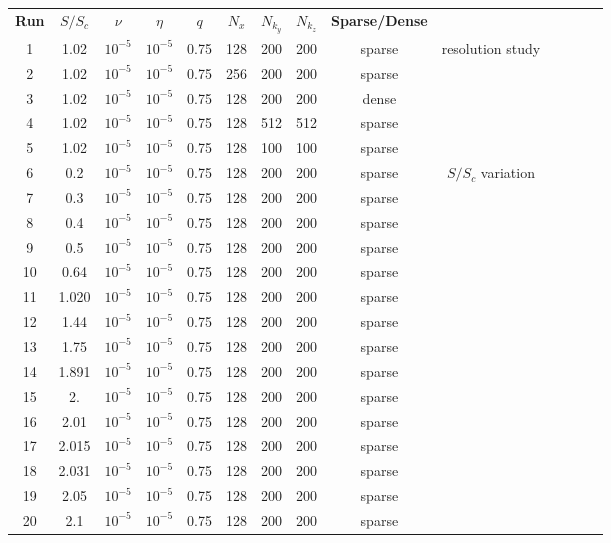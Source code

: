 \documentclass[aps,prl,preprint
,superscriptaddress]{revtex4-1}
\newcommand{\SSC}{S/S_{c}}
\begin{document}
\begin{tabular}{cccccccccccccc}
\textbf{Run} & \textbf{$\SSC$} & \textbf{$\nu$} & \textbf{$\eta$} & \textbf{$q$} & \textbf{$N_x$} & \textbf{$N_{k_y}$} & \textbf{$N_{k_z}$} & \textbf{Sparse/Dense}& \\
1  &   1.02 & $10^{-5}$ & $10^{-5}$ & 0.75 & 128 & 200 & 200 & sparse & resolution study\\
2  &   1.02 & $10^{-5}$ & $10^{-5}$ & 0.75 & 256 & 200 & 200 & sparse & \\
3  &   1.02 & $10^{-5}$ & $10^{-5}$ & 0.75 & 128 & 200 & 200 & dense  & \\
4  &   1.02 & $10^{-5}$ & $10^{-5}$ & 0.75 & 128 & 512 & 512 & sparse & \\
5  &   1.02 & $10^{-5}$ & $10^{-5}$ & 0.75 & 128 & 100 & 100 & sparse & \\
6  &   0.2  & $10^{-5}$ & $10^{-5}$ & 0.75 & 128 & 200 & 200 & sparse & $\SSC$ variation\\
7  &   0.3  & $10^{-5}$ & $10^{-5}$ & 0.75 & 128 & 200 & 200 & sparse & \\
8  &   0.4  & $10^{-5}$ & $10^{-5}$ & 0.75 & 128 & 200 & 200 & sparse & \\
9  &   0.5  & $10^{-5}$ & $10^{-5}$ & 0.75 & 128 & 200 & 200 & sparse & \\
10 &   0.64 & $10^{-5}$ & $10^{-5}$ & 0.75 & 128 & 200 & 200 & sparse & \\
11 & 1.020  & $10^{-5}$ & $10^{-5}$ & 0.75 & 128 & 200 & 200 & sparse & \\
12 & 1.44   & $10^{-5}$ & $10^{-5}$ & 0.75 & 128 & 200 & 200 & sparse & \\
13 & 1.75   & $10^{-5}$ & $10^{-5}$ & 0.75 & 128 & 200 & 200 & sparse & \\
14 & 1.891  & $10^{-5}$ & $10^{-5}$ & 0.75 & 128 & 200 & 200 & sparse & \\
15 & 2.     & $10^{-5}$ & $10^{-5}$ & 0.75 & 128 & 200 & 200 & sparse & \\
16 & 2.01   & $10^{-5}$ & $10^{-5}$ & 0.75 & 128 & 200 & 200 & sparse & \\
17 & 2.015  & $10^{-5}$ & $10^{-5}$ & 0.75 & 128 & 200 & 200 & sparse & \\
18 & 2.031  & $10^{-5}$ & $10^{-5}$ & 0.75 & 128 & 200 & 200 & sparse & \\
19 & 2.05   & $10^{-5}$ & $10^{-5}$ & 0.75 & 128 & 200 & 200 & sparse & \\
20 & 2.1    & $10^{-5}$ & $10^{-5}$ & 0.75 & 128 & 200 & 200 & sparse & \\

\end{tabular}
\end{document}
